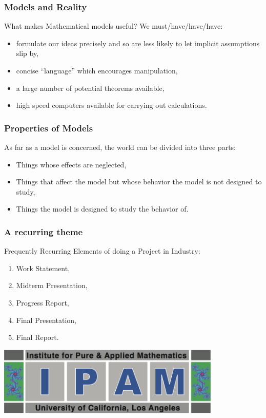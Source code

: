 \documentclass[hyperref={colorlinks=false},compress,handout,10pt]{beamer}
\let\olditem\item
\renewcommand{\item}{\setlength{\itemsep}{0.5\baselineskip}\olditem}
\begin{document}
\begin{frame}
    \frametitle{Models and Reality}
    What makes Mathematical models useful? We must/have/have/have:
    \vskip0.1in
    \begin{itemize}
        \item formulate our ideas precisely and so are less likely to let implicit assumptions slip by,
        \item concise ``language'' which encourages manipulation,
        \item a large number of potential theorems available,
        \item high speed computers available for carrying out calculations.
    \end{itemize}
\end{frame}

\begin{frame}
    \frametitle{Properties of Models}
    As far as a model is concerned, the world can be divided into three parts:
    \vskip0.1in
    \begin{itemize}
        \item Things whose effects are neglected,
        \item Things that affect the model but whose behavior the model is not
            designed to study,
        \item Things the model is designed to study the behavior of. 
    \end{itemize}
\end{frame}
    
\begin{frame}
    \frametitle{A recurring theme}
    Frequently Recurring Elements of doing a Project in Industry:
    \vspace{7pt}
             \begin{enumerate}
                 \item Work Statement,
                 \item Midterm Presentation,
                 \item Progress Report,
                 \item Final Presentation,
                 \item Final Report.
             \end{enumerate}
    \begin{center}
        \href{http://www.ipam.ucla.edu/programs/rips2011/}{
        \includegraphics[width=0.8\textwidth]{images/ipam}}        
    \end{center}
\end{frame}
\end{document}
